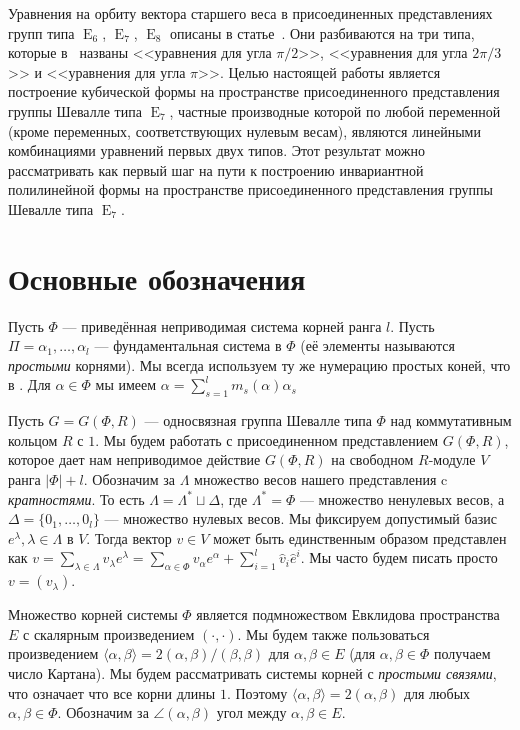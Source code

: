 \documentclass[a4paper,12pt]{amsart}
\def\E{\operatorname{E}}
\theoremstyle{plain}
\theoremstyle{remark}
\theoremstyle{definition}
\begin{document}
Уравнения на орбиту вектора старшего веса в присоединенных представлениях
групп типа $\E_6$, $\E_7$, $\E_8$ описаны в статье~\cite{Luzgarev_adjoint}.
Они разбиваются на три
типа, которые в~\cite{Luzgarev_adjoint} названы <<уравнения для угла $\pi/2$>>,
<<уравнения для угла $2\pi/3$>> и <<уравнения для угла $\pi$>>.
Целью настоящей работы является построение кубической формы на пространстве
присоединенного представления группы Шевалле типа $\E_7$, частные производные
которой по любой переменной (кроме переменных, соответствующих нулевым весам),
являются линейными комбинациями уравнений первых двух типов.
Этот результат можно рассматривать как первый шаг на пути к построению
инвариантной полилинейной формы на пространстве присоединенного представления
группы Шевалле типа $\E_7$.

\section{Основные обозначения}
Пусть $\Phi$ --- приведённая неприводимая система корней ранга $l$. Пусть $\Pi={\alpha_1,\ldots,\alpha_l}$ --- фундаментальная система в $\Phi$ (её элементы называются \emph{простыми} корнями). Мы всегда используем ту же нумерацию простых коней, что в \cite{Bourbaki}. Для $\alpha\in\Phi$ мы имеем $\alpha = \sum_{s=1}^{l}m_s(\alpha)\alpha_s$

Пусть $G=G(\Phi,R)$ --- односвязная группа Шевалле типа $\Phi$ над коммутативным кольцом $R$ с $1$. Мы будем работать с присоединенном представлением $G(\Phi,R)$, которое дает нам неприводимое действие $G(\Phi,R)$ на свободном $R$-модуле $V$ ранга $|\Phi|+l$. Обозначим за $\Lambda$ множество весов нашего представления c \emph{кратностями}. То есть $\Lambda = \Lambda^{*}\sqcup\Delta$, где $\Lambda^{*} = \Phi$ --- множество ненулевых весов, а $\Delta = \{0_1, \ldots ,0_l\}$ --- множество нулевых весов. Мы фиксируем допустимый базис $e^{\lambda}, \lambda \in \Lambda$ в $V$. Тогда вектор $v \in V$ может быть единственным образом представлен как $v=\sum_{\lambda \in \Lambda}v_{\lambda}e^{\lambda} = \sum_{\alpha \in \Phi}v_{\alpha}e^{\alpha} + \sum_{i=1}^{l}\hat{v}_{i}\hat{e}^{i}$. Мы часто будем писать просто $v=(v_{\lambda})$.

Множество корней системы $\Phi$ является подмножеством Евклидова пространства $E$ с скалярным произведением $(\cdot,\cdot)$. Мы будем также пользоваться произведением $\langle\alpha,\beta\rangle = 2(\alpha,\beta)/(\beta,\beta)$ для $\alpha, \beta \in E$ (для $\alpha, \beta \in \Phi$ получаем число Картана). Мы будем рассматривать системы корней с \emph{простыми связями}, что означает что все корни длины $1$. Поэтому $\langle\alpha, \beta\rangle = 2(\alpha,\beta)$ для любых $\alpha, \beta \in \Phi$. Обозначим за $\angle(\alpha, \beta)$ угол между $\alpha,\beta \in E$.
\end{document}
